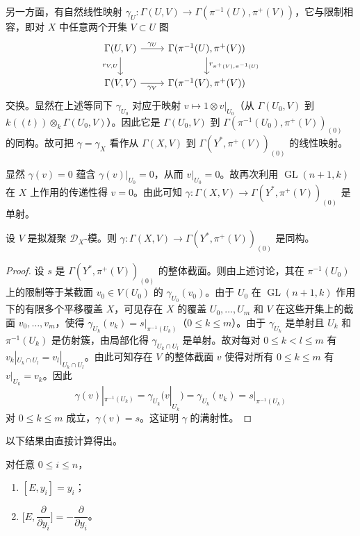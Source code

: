 另一方面，有自然线性映射 $\gamma_U:\Gamma(U,V)\to\Gamma(\pi^{-1}(U),\pi^+(V))$，它与限制相容，即对 $X$ 中任意两个开集 $V\subset U$ 图
$$\begin{tikzcd}
\Gamma(U,V) \arrow[r,"\gamma_U"] \arrow[d,"r_{V,U}"'] & \Gamma(\pi^{-1}(U),\pi^+(V)) \arrow[d,"r_{\pi^+(V),\pi^{-1}(U)}"]\\
\Gamma(V,V) \arrow[r,"\gamma_V"'] & \Gamma(\pi^{-1}(V),\pi^+(V))
\end{tikzcd}$$
交换。显然在上述等同下 $\gamma_{U_0}$ 对应于映射 $v\longmapsto 1\otimes v|_{U_0}$（从 $\Gamma(U_0,V)$ 到 $k((t))\otimes_k\Gamma(U_0,V)$）。因此它是 $\Gamma(U_0,V)$ 到 $\Gamma(\pi^{-1}(U_0),\pi^+(V))_{(0)}$ 的同构。故可把 $\gamma=\gamma_X$ 看作从 $\Gamma(X,V)$ 到 $\Gamma(Y^*,\pi^+(V))_{(0)}$ 的线性映射。

显然 $\gamma(v)=0$ 蕴含 $\gamma(v)|_{U_0}=0$，从而 $v|_{U_0}=0$。故再次利用 $\operatorname{GL}(n+1,k)$ 在 $X$ 上作用的传递性得 $v=0$。由此可知 $\gamma:\Gamma(X,V)\to\Gamma(Y^*,\pi^+(V))_{(0)}$ 是单射。

\begin{lemma}
设 $V$ 是拟凝聚 $\mathcal{D}_X$-模。则 $\gamma:\Gamma(X,V)\to\Gamma(Y^*,\pi^+(V))_{(0)}$ 是同构。
\end{lemma}

\begin{proof}
设 $s$ 是 $\Gamma(Y^*,\pi^+(V))_{(0)}$ 的整体截面。则由上述讨论，其在 $\pi^{-1}(U_0)$ 上的限制等于某截面 $v_0\in V(U_0)$ 的 $\gamma_{U_0}(v_0)$。由于 $U_0$ 在 $\operatorname{GL}(n+1,k)$ 作用下的有限多个平移覆盖 $X$，可见存在 $X$ 的覆盖 $U_0,\dots,U_m$ 和 $V$ 在这些开集上的截面 $v_0,\dots,v_m$，使得 $\gamma_{U_k}(v_k)=s|_{\pi^{-1}(U_k)}$（$0\le k\le m$）。由于 $\gamma_{U_k}$ 是单射且 $U_k$ 和 $\pi^{-1}(U_k)$ 是仿射簇，由局部化得 $\gamma_{U_k\cap U_l}$ 是单射。故对每对 $0\le k<l\le m$ 有 $v_k|_{U_k\cap U_l}=v_l|_{U_k\cap U_l}$。由此可知存在 $V$ 的整体截面 $v$ 使得对所有 $0\le k\le m$ 有 $v|_{U_k}=v_k$。因此
$$\gamma(v)|_{\pi^{-1}(U_k)}=\gamma_{U_k}(v|_{U_k})=\gamma_{U_k}(v_k)=s|_{\pi^{-1}(U_k)}$$
对 $0\le k\le m$ 成立，$\gamma(v)=s$。这证明 $\gamma$ 的满射性。
\end{proof}

以下结果由直接计算得出。

\begin{lemma}
对任意 $0\le i\le n$，
\begin{enumerate}[label=(\roman*)]
  \item $[E,y_i]=y_i$；
  \item $\bigl[E,\dfrac{\partial}{\partial y_i}\bigr]=-\dfrac{\partial}{\partial y_i}$。
\end{enumerate}
\end{lemma}


